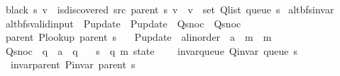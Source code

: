 \begin{isabellebody}
\ \ {\isachardoublequoteopen}black\ s\ v\ {\isasymequiv}\ is{\isacharunderscore}{\kern0pt}discovered\ src\ {\isacharparenleft}{\kern0pt}parent\ s{\isacharparenright}{\kern0pt}\ v\ {\isasymand}\ v\ {\isasymnotin}\ set\ {\isacharparenleft}{\kern0pt}Q{\isacharunderscore}{\kern0pt}list\ {\isacharparenleft}{\kern0pt}queue\ s{\isacharparenright}{\kern0pt}{\isacharparenright}{\kern0pt}{\isachardoublequoteclose}\isanewline
\isanewline
{}\isamarkupfalse%
\ alt{\isacharunderscore}{\kern0pt}bfs{\isacharunderscore}{\kern0pt}invar\ {\isacharequal}{\kern0pt}\isanewline
\ \ alt{\isacharunderscore}{\kern0pt}bfs{\isacharunderscore}{\kern0pt}valid{\isacharunderscore}{\kern0pt}input\ \ P{\isacharunderscore}{\kern0pt}update\ {\isacharequal}{\kern0pt}\ P{\isacharunderscore}{\kern0pt}update\ \ Q{\isacharunderscore}{\kern0pt}snoc\ {\isacharequal}{\kern0pt}\ Q{\isacharunderscore}{\kern0pt}snoc\ {\isacharplus}{\kern0pt}\isanewline
\ \ parent\ {\isachardoublequoteopen}P{\isacharunderscore}{\kern0pt}lookup\ {\isacharparenleft}{\kern0pt}parent\ s{\isacharparenright}{\kern0pt}{\isachardoublequoteclose}\ \isanewline
\ \ P{\isacharunderscore}{\kern0pt}update\ {\isacharcolon}{\kern0pt}{\isacharcolon}{\kern0pt}\ {\isachardoublequoteopen}{\isacharprime}{\kern0pt}a{\isacharcolon}{\kern0pt}{\isacharcolon}{\kern0pt}linorder\ {\isasymRightarrow}\ {\isacharprime}{\kern0pt}a\ {\isasymRightarrow}\ {\isacharprime}{\kern0pt}m\ {\isasymRightarrow}\ {\isacharprime}{\kern0pt}m{\isachardoublequoteclose}\ \isanewline
\ \ Q{\isacharunderscore}{\kern0pt}snoc\ {\isacharcolon}{\kern0pt}{\isacharcolon}{\kern0pt}\ {\isachardoublequoteopen}{\isacharprime}{\kern0pt}q\ {\isasymRightarrow}\ {\isacharprime}{\kern0pt}a\ {\isasymRightarrow}\ {\isacharprime}{\kern0pt}q{\isachardoublequoteclose}\ \isanewline
\ \ s\ {\isacharcolon}{\kern0pt}{\isacharcolon}{\kern0pt}\ {\isachardoublequoteopen}{\isacharparenleft}{\kern0pt}{\isacharprime}{\kern0pt}q{\isacharcomma}{\kern0pt}\ {\isacharprime}{\kern0pt}m{\isacharparenright}{\kern0pt}\ state{\isachardoublequoteclose}\ {\isacharplus}{\kern0pt}\isanewline
\ \ \ invar{\isacharunderscore}{\kern0pt}queue{\isacharcolon}{\kern0pt}\ {\isachardoublequoteopen}Q{\isacharunderscore}{\kern0pt}invar\ {\isacharparenleft}{\kern0pt}queue\ s{\isacharparenright}{\kern0pt}{\isachardoublequoteclose}\isanewline
\ \ \ invar{\isacharunderscore}{\kern0pt}parent{\isacharcolon}{\kern0pt}\ {\isachardoublequoteopen}P{\isacharunderscore}{\kern0pt}invar\ {\isacharparenleft}{\kern0pt}parent\ s{\isacharparenright}{\kern0pt}{\isachardoublequoteclose}\isanewline

\end{isabellebody}
